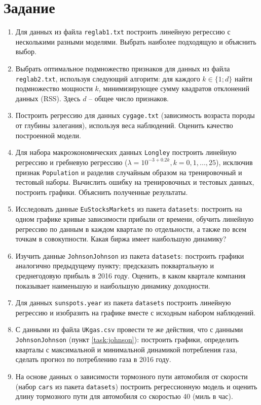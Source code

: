 \documentclass[a4paper,12pt]{article} %
\begin{document}


\section{Задание}

\begin{enumerate}[noitemsep]
    \item Для данных из файла \texttt{reglab1.txt} построить линейную регрессию с несколькими разными моделями.
    Выбрать наиболее подходящую и объяснить выбор.
    \item Выбрать оптимальное подмножество признаков для данных из файла \texttt{reglab2.txt}, используя следующий алгоритм: для каждого $k \in \{1;d\}$ найти подмножество мощности $k$, минимизирующее сумму квадратов отклонений данных (RSS).
    Здесь $d$ -- общее число признаков.
    \item Построить регрессию для данных \texttt{cygage.txt} (зависимость возраста породы от глубины залегания), используя веса наблюдений.
    Оценить качество построенной модели.
    \item Для набора макроэкономических данных \texttt{Longley} построить линейную регрессию и гребневую регрессию ($ \lambda = 10^{-3 + 0.2 k}, k = 0, 1, ..., 25 $), исключив признак \texttt{Population} и разделив случайным образом на тренировочный и тестовый наборы.
    Вычислить ошибку на тренировочных и тестовых данных, построить графики.
    Объяснить полученные результаты.
    \item Исследовать данные \texttt{EuStocksMarkets} из пакета \texttt{datasets}: построить на одном графике кривые зависимости прибыли от времени, обучить линейную регрессию по данным в каждом квартале по отдельности, а также по всем точкам в совокупности.
    Какая биржа имеет наибольшую динамику?
    \item Изучить данные \texttt{JohnsonJohnson} из пакета \texttt{datasets}: построить графики аналогично предыдущему пункту; предсказать поквартальную и среднегодовую прибыль в 2016 году. \label{task:johnson}
    Оценить, в каком квартале компания показывает наименьшую и наибольшую динамику доходности.
    \item Для данных \texttt{sunspots.year} из пакета \texttt{datasets} построить линейную регрессию и изобразить на графике вместе с исходным набором наблюдений.
    \item С данными из файла \texttt{UKgas.csv} провести те же действия, что с данными \texttt{JohnsonJohnson} (пункт \ref{task:johnson}): построить графики, определить кварталы с максимальной и минимальной динамикой потребления газа, сделать прогноз по потреблению газа в 2016 году.
    \item На основе данных о зависимости тормозного пути автомобиля от скорости (набор \texttt{cars} из пакета \texttt{datasets}) построить регрессионную модель и оценить длину тормозного пути для автомобиля со скоростью 40 (миль в час).
\end{enumerate}
\end{document}
